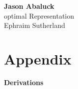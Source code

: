 \documentclass[12pt]{article}
\newcommand{\1}{\mathds{1}}
\begin{document}
\begin{center}
	{\large \bf Jason Abaluck }   \\ \large optimal Representation \\ Ephraim Sutherland
\end{center}

\tableofcontents








\section{Appendix}

\begin{center}
	{\large \bf Derivations }
\end{center}







\end{document}
